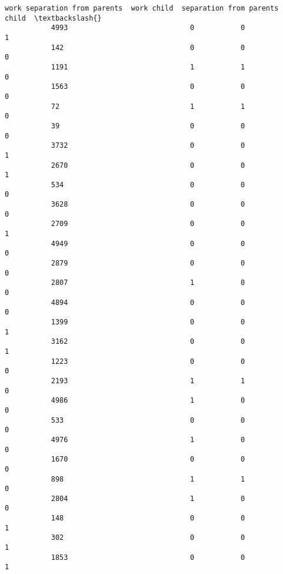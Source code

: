 \documentclass[11pt]{article}
\begin{document}
\begin{Verbatim}[commandchars=\\\{\}]
                 work separation from parents  work child  separation from parents child  \textbackslash{}
           4993                             0           0                              1   
           142                              0           0                              0   
           1191                             1           1                              0   
           1563                             0           0                              0   
           72                               1           1                              0   
           39                               0           0                              0   
           3732                             0           0                              1   
           2670                             0           0                              1   
           534                              0           0                              0   
           3628                             0           0                              0   
           2709                             0           0                              1   
           4949                             0           0                              0   
           2879                             0           0                              0   
           2807                             1           0                              0   
           4894                             0           0                              0   
           1399                             0           0                              1   
           3162                             0           0                              1   
           1223                             0           0                              0   
           2193                             1           1                              0   
           4986                             1           0                              0   
           533                              0           0                              0   
           4976                             1           0                              0   
           1670                             0           0                              0   
           898                              1           1                              0   
           2804                             1           0                              0   
           148                              0           0                              1   
           302                              0           0                              1   
           1853                             0           0                              1   

\end{Verbatim}
\end{document}
